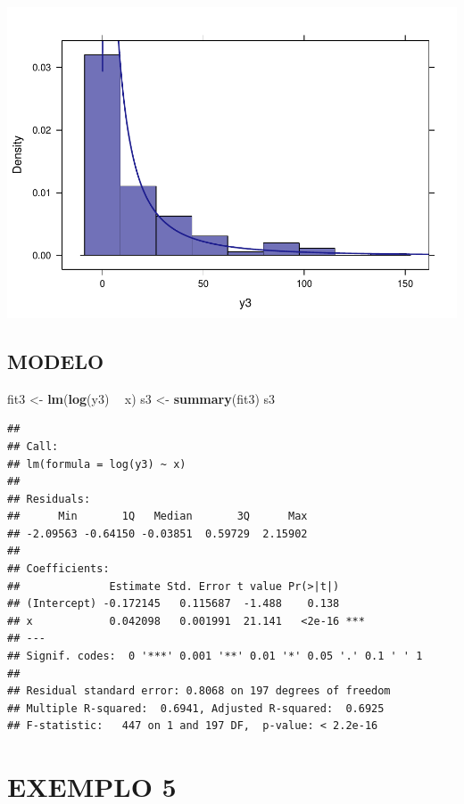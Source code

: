 \documentclass[]{article}
\newenvironment{Shaded}{\begin{snugshade}}{\end{snugshade}}
\newcommand{\KeywordTok}[1]{\textcolor[rgb]{0.13,0.29,0.53}{\textbf{#1}}}
\newcommand{\StringTok}[1]{\textcolor[rgb]{0.31,0.60,0.02}{#1}}
\newcommand{\OperatorTok}[1]{\textcolor[rgb]{0.81,0.36,0.00}{\textbf{#1}}}
\newcommand{\NormalTok}[1]{#1}
\begin{document}
\includegraphics{Impacto_sigma_files/figure-latex/unnamed-chunk-16-1.pdf}

\subsection{MODELO}\label{modelo-3}

\begin{Shaded}
\begin{Highlighting}[]
\NormalTok{fit3 <-}\StringTok{ }\KeywordTok{lm}\NormalTok{(}\KeywordTok{log}\NormalTok{(y3) }\OperatorTok{~}\StringTok{ }\NormalTok{x)}
\NormalTok{s3 <-}\StringTok{ }\KeywordTok{summary}\NormalTok{(fit3)}
\NormalTok{s3}
\end{Highlighting}
\end{Shaded}

\begin{verbatim}
## 
## Call:
## lm(formula = log(y3) ~ x)
## 
## Residuals:
##      Min       1Q   Median       3Q      Max 
## -2.09563 -0.64150 -0.03851  0.59729  2.15902 
## 
## Coefficients:
##              Estimate Std. Error t value Pr(>|t|)    
## (Intercept) -0.172145   0.115687  -1.488    0.138    
## x            0.042098   0.001991  21.141   <2e-16 ***
## ---
## Signif. codes:  0 '***' 0.001 '**' 0.01 '*' 0.05 '.' 0.1 ' ' 1
## 
## Residual standard error: 0.8068 on 197 degrees of freedom
## Multiple R-squared:  0.6941, Adjusted R-squared:  0.6925 
## F-statistic:   447 on 1 and 197 DF,  p-value: < 2.2e-16
\end{verbatim}

\section{EXEMPLO 5}\label{exemplo-5}
\end{document}
